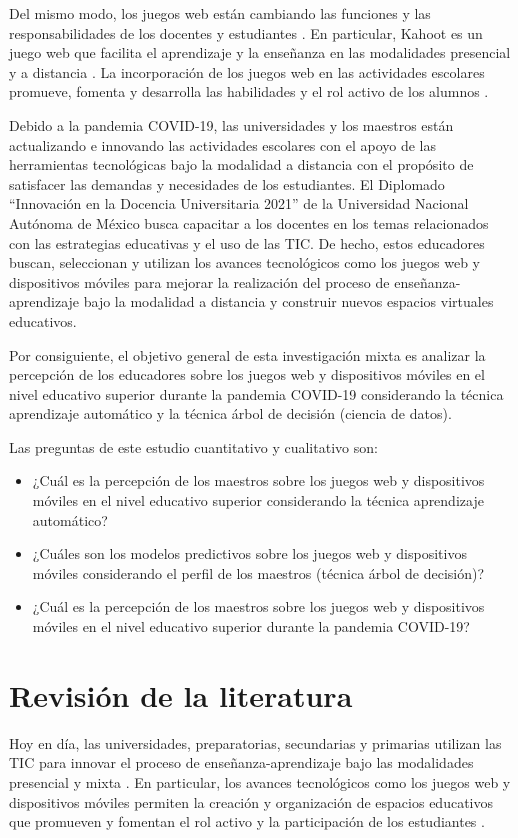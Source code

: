 \documentclass[spanish]{textolivre}
\begin{document}
Del mismo modo, los juegos web están cambiando las funciones y las responsabilidades de los docentes y estudiantes \cite{felszeghy2019, ismail2019}. En particular, Kahoot es un juego web que facilita el aprendizaje y la enseñanza en las modalidades presencial y a distancia \cite{licorish2018, ismail2019}. La incorporación de los juegos web en las actividades escolares promueve, fomenta y desarrolla las habilidades y el rol activo de los alumnos \cite{donald2017, smith2020}.

Debido a la pandemia COVID-19, las universidades y los maestros están actualizando e innovando las actividades escolares con el apoyo de las herramientas tecnológicas bajo la modalidad a distancia con el propósito de satisfacer las demandas y necesidades de los estudiantes. El Diplomado “Innovación en la Docencia Universitaria 2021” de la Universidad Nacional Autónoma de México busca capacitar a los docentes en los temas relacionados con las estrategias educativas y el uso de las TIC. De hecho, estos educadores buscan, seleccionan y utilizan los avances tecnológicos como los juegos web y dispositivos móviles para mejorar la realización del proceso de enseñanza-aprendizaje bajo la modalidad a distancia y construir nuevos espacios virtuales educativos. 

Por consiguiente, el objetivo general de esta investigación mixta es analizar la percepción de los educadores sobre los juegos web y dispositivos móviles en el nivel educativo superior durante la pandemia COVID-19 considerando la técnica aprendizaje automático y la técnica árbol de decisión (ciencia de datos).

Las preguntas de este estudio cuantitativo y cualitativo son:
\begin{itemize}
    \item ¿Cuál es la percepción de los maestros sobre los juegos web y dispositivos móviles en el nivel educativo superior considerando la técnica aprendizaje automático? 
    \item ¿Cuáles son los modelos predictivos sobre los juegos web y dispositivos móviles  considerando el perfil de los maestros (técnica árbol de decisión)? \item ¿Cuál es la percepción de los maestros sobre los juegos web y dispositivos móviles en el nivel educativo superior durante la pandemia COVID-19? 
\end{itemize}

\section{Revisión de la literatura}
Hoy en día, las universidades, preparatorias, secundarias y primarias utilizan las TIC para innovar el proceso de enseñanza-aprendizaje bajo las modalidades presencial y mixta \cite{felszeghy2019, karatas2021}. En particular, los avances tecnológicos como los juegos web y dispositivos móviles permiten la creación y organización de espacios educativos que promueven y fomentan el rol activo y la participación de los estudiantes \cite{ismail2019, saribas2021}. 
\end{document}
